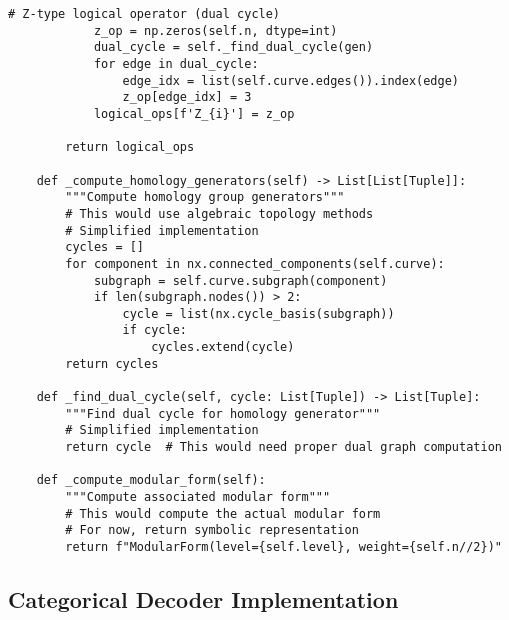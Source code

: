 \documentclass[12pt,a4paper]{article}
\begin{document}
\begin{lstlisting}[style=python,caption=Modular surface code on Shimura variety]
            # Z-type logical operator (dual cycle)
            z_op = np.zeros(self.n, dtype=int)
            dual_cycle = self._find_dual_cycle(gen)
            for edge in dual_cycle:
                edge_idx = list(self.curve.edges()).index(edge)
                z_op[edge_idx] = 3
            logical_ops[f'Z_{i}'] = z_op
        
        return logical_ops
    
    def _compute_homology_generators(self) -> List[List[Tuple]]:
        """Compute homology group generators"""
        # This would use algebraic topology methods
        # Simplified implementation
        cycles = []
        for component in nx.connected_components(self.curve):
            subgraph = self.curve.subgraph(component)
            if len(subgraph.nodes()) > 2:
                cycle = list(nx.cycle_basis(subgraph))
                if cycle:
                    cycles.extend(cycle)
        return cycles
    
    def _find_dual_cycle(self, cycle: List[Tuple]) -> List[Tuple]:
        """Find dual cycle for homology generator"""
        # Simplified implementation
        return cycle  # This would need proper dual graph computation
    
    def _compute_modular_form(self):
        """Compute associated modular form"""
        # This would compute the actual modular form
        # For now, return symbolic representation
        return f"ModularForm(level={self.level}, weight={self.n//2})"
\end{lstlisting}

\subsection{Categorical Decoder Implementation}
\end{document}
